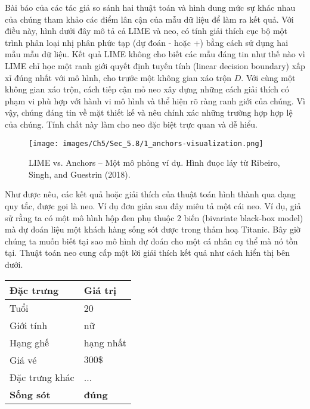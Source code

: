 Bài báo của các tác giả so sánh hai thuật toán và hình dung mức sự khác nhau của chúng tham khảo các điểm lân cận của mẫu dữ liệu để làm ra kết quả. Với điều này, hình dưới đây mô tả cả LIME và neo, có tính giải thích cục bộ một trình phân loại nhị phân phức tạp (dự đoán - hoặc +) bằng cách sử dụng hai mẫu mẫu dữ liệu. Kết quả LIME không cho biết các mẫu đáng tin như thế nào vì LIME chỉ học một ranh giới quyết định tuyến tính (linear decision boundary) xấp xỉ đúng nhất với mô hình, cho trước một không gian xáo trộn $D$. Với cùng một không gian xáo trộn, cách tiếp cận mỏ neo xây dựng những cách giải thích có phạm vi phù hợp với hành vi mô hình và thể hiện rõ ràng ranh giới của chúng. Vì vậy, chúng đáng tin về mặt thiết kế và nêu chính xác những trường hợp hợp lệ của chúng. Tính chất này làm cho neo đặc biệt trực quan và dễ hiểu.

\begin{figure*}[h!]
	\centering
	\texttt{[image: images/Ch5/Sec\_5.8/1\_anchors-visualization.png]}
	\label{fig:5_37}
	\caption{LIME vs. Anchors -- Một mô phỏng ví dụ. Hình đuọc láy từ Ribeiro, Singh, and Guestrin (2018).}
\end{figure*}



Như được nêu, các kết quả hoặc giải thích của thuật toán hình thành qua dạng quy tắc, được gọi là neo. Ví dụ đơn giản sau đây miêu tả một cái neo. Ví dụ, giả sử rằng ta có một mô hình hộp đen phụ thuộc 2 biến (bivariate black-box model) mà dự đoán liệu một khách hàng sống sót được trong thảm hoạ Titanic. Bây giờ chúng ta muốn biết tại sao mô hình dự đoán cho một cá nhân cụ thể mà nó tồn tại. Thuật toán neo cung cấp một lời giải thích kết quả như cách hiển thị bên dưới. 

\begin{table}[hbt!]
\centering
\begin{tabular}{|l|l|}
\hline
   \textbf{Đặc trưng} & \textbf{Giá trị}  \\ 
\hline
Tuổi & 20  \\ 
\hline
Giới tính & nữ  \\ 
\hline
Hạng ghế & hạng nhất \\
\hline
Giá vé & $300\$$  \\
\hline
Đặc trưng khác & ... \\
\hline
\textbf{Sống sót} & \textbf{đúng} \\ 
\hline
\end{tabular}
\end{table}

